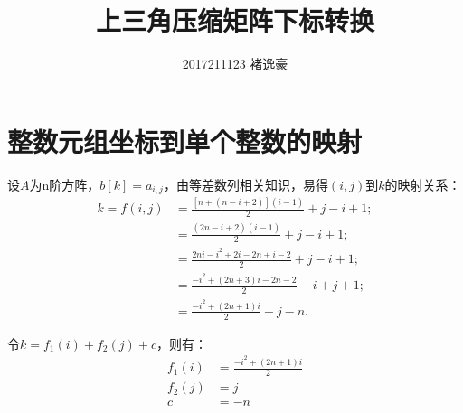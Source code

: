 \documentclass[UTF8]{ctexart}
\author{2017211123 褚逸豪}
\title{上三角压缩矩阵下标转换}
\begin{document}
    \maketitle
    \section{整数元组坐标到单个整数的映射}
    设$A$为n阶方阵，$b[k]=a_{i,j}$，由等差数列相关知识，易得$(i,j)$到$k$的映射关系：
    $$\begin{aligned}
        k=f(i,j)&=\frac{[n+(n-i+2)](i-1)}{2}+j-i+1;\\
        &=\frac{(2n-i+2)(i-1)}{2}+j-i+1;\\
        &=\frac{2ni-i^2+2i-2n+i-2}{2}+j-i+1;\\
        &=\frac{-i^2+(2n+3)i-2n-2}{2}-i+j+1;\\
        &=\frac{-i^2+(2n+1)i}{2}+j-n.
    \end{aligned}$$
    \par
    令$k=f_1(i)+f_2(j)+c$，则有：
    $$\begin{aligned}
        f_1(i)&=\frac{-i^2+(2n+1)i}{2}\\
        f_2(j)&=j\\
        c&=-n
    \end{aligned}$$
\end{document}
